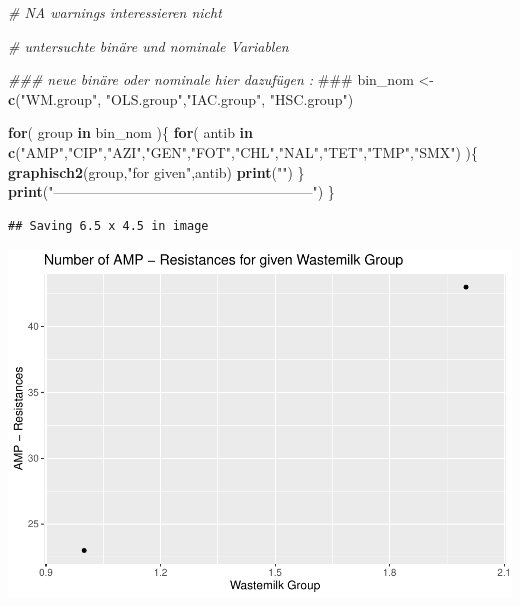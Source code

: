 \documentclass[
]{article}
\newenvironment{Shaded}{\begin{snugshade}}{\end{snugshade}}
\newcommand{\AlertTok}[1]{\textcolor[rgb]{0.94,0.16,0.16}{#1}}
\newcommand{\CommentTok}[1]{\textcolor[rgb]{0.56,0.35,0.01}{\textit{#1}}}
\newcommand{\ControlFlowTok}[1]{\textcolor[rgb]{0.13,0.29,0.53}{\textbf{#1}}}
\newcommand{\KeywordTok}[1]{\textcolor[rgb]{0.13,0.29,0.53}{\textbf{#1}}}
\newcommand{\NormalTok}[1]{#1}
\newcommand{\StringTok}[1]{\textcolor[rgb]{0.31,0.60,0.02}{#1}}
\begin{document}
\begin{Shaded}
\begin{Highlighting}[]
\CommentTok{# NA warnings interessieren nicht}

\CommentTok{# untersuchte binäre und nominale Variablen }

\CommentTok{### neue binäre oder nominale hier dazufügen : }\AlertTok{###}
\NormalTok{bin_nom <-}\StringTok{ }\KeywordTok{c}\NormalTok{(}\StringTok{"WM.group"}\NormalTok{, }\StringTok{"OLS.group"}\NormalTok{,}\StringTok{"IAC.group"}\NormalTok{,   }\StringTok{"HSC.group"}\NormalTok{)       }

\ControlFlowTok{for}\NormalTok{( group }\ControlFlowTok{in}\NormalTok{ bin_nom )\{}
  \ControlFlowTok{for}\NormalTok{( antib }\ControlFlowTok{in} \KeywordTok{c}\NormalTok{(}\StringTok{"AMP"}\NormalTok{,}\StringTok{"CIP"}\NormalTok{,}\StringTok{"AZI"}\NormalTok{,}\StringTok{"GEN"}\NormalTok{,}\StringTok{"FOT"}\NormalTok{,}\StringTok{"CHL"}\NormalTok{,}\StringTok{"NAL"}\NormalTok{,}\StringTok{"TET"}\NormalTok{,}\StringTok{"TMP"}\NormalTok{,}\StringTok{"SMX"}\NormalTok{) )\{}
    \KeywordTok{graphisch2}\NormalTok{(group,}\StringTok{"for given"}\NormalTok{,antib)  }
    \KeywordTok{print}\NormalTok{(}\StringTok{""}\NormalTok{)}
\NormalTok{  \} }
  \KeywordTok{print}\NormalTok{(}\StringTok{"--------------------------------------------------------"}\NormalTok{)}
\NormalTok{\}}
\end{Highlighting}
\end{Shaded}

\begin{verbatim}
## Saving 6.5 x 4.5 in image
\end{verbatim}

\includegraphics{NResistenzen_files/figure-latex/binary_or_nominal_variables-1.pdf}
\end{document}
